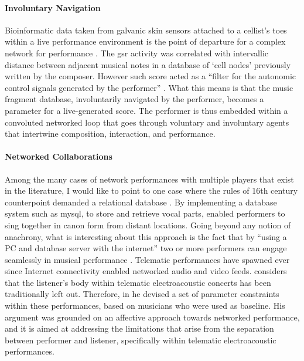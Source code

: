 \documentclass[
]{book}
\begin{document}
\paragraph{Involuntary Navigation}
Bioinformatic data taken from galvanic skin sensors attached to a cellist's toes within a live performance environment is the point of departure for a complex network for performance \parencite{icmc/bbp2372.2006.123}. The \gls{gsr} activity was correlated with intervallic distance between adjacent musical notes in a database of `cell nodes' previously written by the composer. However such score acted as a ``filter for the autonomic control signals generated by the performer'' \parencite[601]{icmc/bbp2372.2006.123}. What this means is that the music fragment database, involuntarily navigated by the performer, becomes a parameter for a live-generated score. The performer is thus embedded within a convoluted networked loop that goes through voluntary and involuntary agents that intertwine composition, interaction, and performance.

\paragraph{Networked Collaborations}
Among the many cases of network performances with multiple players that exist in the literature, I would like to point to one case where the rules of 16th century counterpoint demanded a relational database \parencite{Nakamoto2007}. By implementing a database system such as \gls{mysql}, to store and retrieve vocal parts, \citeauthor{Nakamoto2007} enabled performers to sing together in canon form from distant locations. Going beyond any notion of anachrony, what is interesting about this approach is the fact that by ``using a PC and database server with the internet'' two or more performers can engage seamlessly in musical performance \parencite{Nakamoto2007}. Telematic performances have spawned ever since Internet connectivity enabled networked audio and video feeds. \textcite{icmc/bbp2372.2014.046} considers that the listener's body within telematic electroacoustic concerts has been traditionally left out. Therefore, in he devised a set of parameter constraints within these performances, based on musicians who were used as baseline. His argument was grounded on an affective approach towards networked performance, and it is aimed at addressing the limitations that arise from the separation between performer and listener, specifically within telematic electroacoustic performances.
\end{document}
